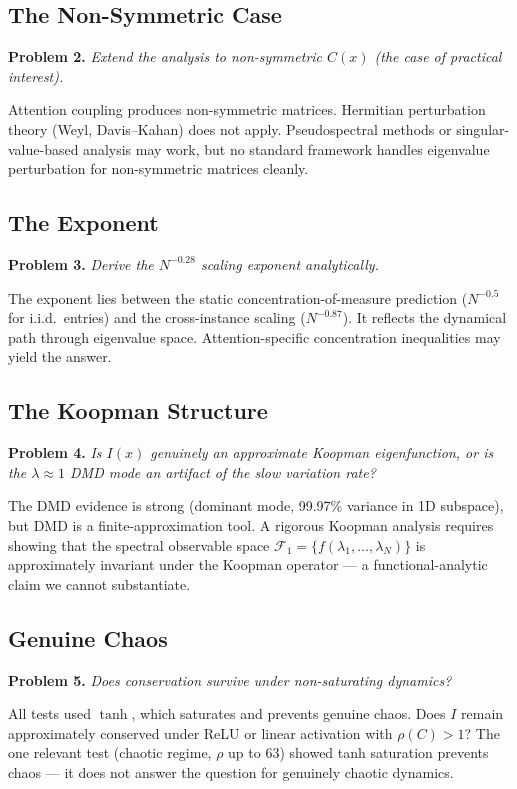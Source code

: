 \documentclass[11pt]{article}
\begin{document}
\subsection{The Non-Symmetric Case}

\textbf{Problem 2.} \textit{Extend the analysis to non-symmetric $C(x)$ (the case of practical interest).}

Attention coupling produces non-symmetric matrices. Hermitian perturbation theory (Weyl, Davis--Kahan) does not apply. Pseudospectral methods or singular-value-based analysis may work, but no standard framework handles eigenvalue perturbation for non-symmetric matrices cleanly.

\subsection{The Exponent}

\textbf{Problem 3.} \textit{Derive the $N^{-0.28}$ scaling exponent analytically.}

The exponent lies between the static concentration-of-measure prediction ($N^{-0.5}$ for i.i.d.\ entries) and the cross-instance scaling ($N^{-0.87}$). It reflects the dynamical path through eigenvalue space. Attention-specific concentration inequalities may yield the answer.

\subsection{The Koopman Structure}

\textbf{Problem 4.} \textit{Is $I(x)$ genuinely an approximate Koopman eigenfunction, or is the $\lambda \approx 1$ DMD mode an artifact of the slow variation rate?}

The DMD evidence is strong (dominant mode, 99.97\% variance in 1D subspace), but DMD is a finite-approximation tool. A rigorous Koopman analysis requires showing that the spectral observable space $\mathcal{F}_1 = \{f(\lambda_1, \ldots, \lambda_N)\}$ is approximately invariant under the Koopman operator --- a functional-analytic claim we cannot substantiate.

\subsection{Genuine Chaos}

\textbf{Problem 5.} \textit{Does conservation survive under non-saturating dynamics?}

All tests used $\tanh$, which saturates and prevents genuine chaos. Does $I$ remain approximately conserved under ReLU or linear activation with $\rho(C) > 1$? The one relevant test (chaotic regime, $\rho$ up to 63) showed tanh saturation prevents chaos --- it does not answer the question for genuinely chaotic dynamics.
\end{document}
